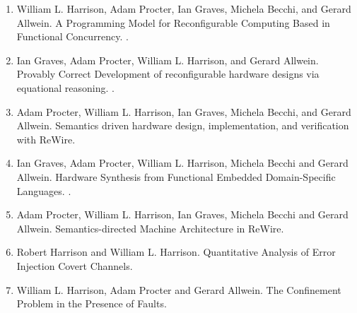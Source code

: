 \documentclass[12pt]{article} %
\begin{document}
\begin{enumerate}[leftmargin=0.0mm]


\item
William L. Harrison, Adam Procter, Ian Graves, Michela Becchi, and Gerard Allwein. 
\newblock A Programming Model for Reconfigurable Computing Based in Functional Concurrency.
.

\item
Ian Graves, Adam Procter, William L. Harrison, and Gerard Allwein.
\newblock Provably Correct Development of reconfigurable hardware designs via equational reasoning.
.

\item
Adam Procter, William L. Harrison, Ian Graves, Michela Becchi, and Gerard Allwein. 
\newblock Semantics driven hardware design, implementation, and verification with ReWire. 

\item
Ian Graves, Adam Procter, William L. Harrison, Michela Becchi and Gerard Allwein.
\newblock Hardware Synthesis from Functional Embedded Domain-Specific Languages.
.


\item
Adam Procter, William L. Harrison, Ian Graves, Michela Becchi and Gerard Allwein.
\newblock Semantics-directed Machine Architecture in ReWire.

\item
Robert Harrison and William L. Harrison.
\newblock Quantitative Analysis of Error Injection Covert Channels.

\item
   William L. Harrison, Adam Procter and Gerard Allwein.
\newblock The Confinement Problem in the Presence of Faults.
                  


\end{enumerate}
\end{document}
